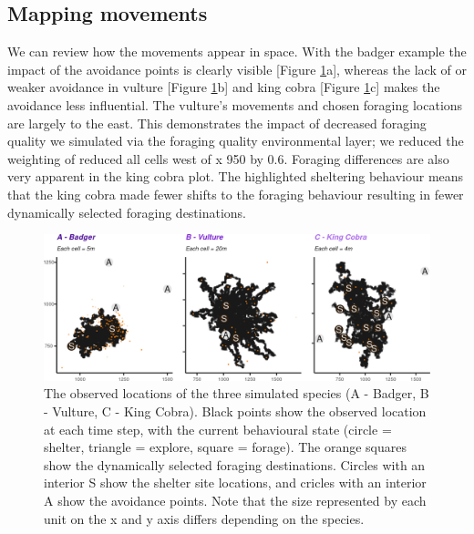 \documentclass[10pt,a4paper]{article}
\begin{document}
\hypertarget{mapping-movements}{%
\subsection{Mapping movements}\label{mapping-movements}}

We can review how the movements appear in space.
With the badger example the impact of the avoidance points is clearly visible {[}Figure \ref{fig:mapsFigure}a{]}, whereas the lack of or weaker avoidance in vulture {[}Figure \ref{fig:mapsFigure}b{]} and king cobra {[}Figure \ref{fig:mapsFigure}c{]} makes the avoidance less influential.
The vulture's movements and chosen foraging locations are largely to the east.
This demonstrates the impact of decreased foraging quality we simulated via the foraging quality environmental layer; we reduced the weighting of reduced all cells west of x 950 by 0.6.
Foraging differences are also very apparent in the king cobra plot.
The highlighted sheltering behaviour means that the king cobra made fewer shifts to the foraging behaviour resulting in fewer dynamically selected foraging destinations.

\begin{figure}

{\centering \includegraphics{Agent-based_model_walkthrough_files/figure-latex/mapsFigure-1} 

}

\caption{The observed locations of the three simulated species (A - Badger, B - Vulture, C - King Cobra). Black points show the observed location at each time step, with the current behavioural state (circle = shelter, triangle = explore, square = forage). The orange squares show the dynamically selected foraging destinations. Circles with an interior S show the shelter site locations, and cricles with an interior A show the avoidance points. Note that the size represented by each unit on the x and y axis differs depending on the species.}\label{fig:mapsFigure}
\end{figure}
\end{document}
